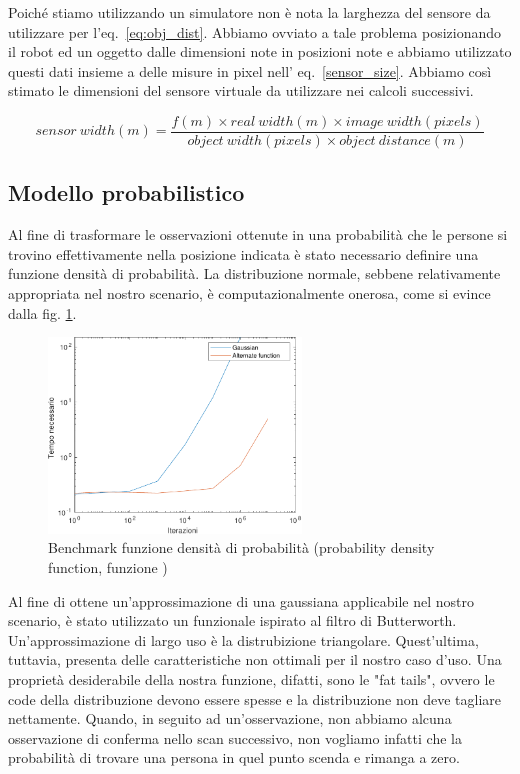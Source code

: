 \documentclass[a4paper]{article}
\begin{document}
	Poiché stiamo utilizzando un simulatore non è nota la larghezza del sensore da utilizzare per l'eq.~\ref{eq:obj_dist}. Abbiamo ovviato a tale problema posizionando il robot ed un oggetto dalle dimensioni note in posizioni note e abbiamo utilizzato questi dati insieme a delle misure in pixel nell' eq.~\ref{sensor_size}. Abbiamo così stimato le dimensioni del sensore virtuale da utilizzare nei calcoli successivi.

	\begin{equation}\label{sensor_size}
	sensor~width(m) = 
	\frac{f(m) \times real~width(m) \times image~width(pixels)}
	{object~width(pixels) \times object~distance(m)}
	\end{equation}
	
	\subsection{Modello probabilistico}\label{subsec:Modello-probabilistico}
	Al fine di trasformare le osservazioni ottenute in una probabilità che le persone si trovino effettivamente nella posizione indicata è stato necessario definire una funzione densità di probabilità. La distribuzione normale, sebbene relativamente appropriata nel nostro scenario, è computazionalmente onerosa, come si evince dalla fig. \ref{fig:pdf_benchmark}.
	
	\begin{figure}[H]
		\centering
		\includegraphics[width=0.6\textwidth]{./img/pdf_benchmark.pdf}
		\caption{Benchmark funzione densità di probabilità (probability density function, funzione )}
		\label{fig:pdf_benchmark}
	\end{figure}

	Al fine di ottene un'approssimazione di una gaussiana applicabile nel nostro scenario, è stato utilizzato un funzionale ispirato al filtro di Butterworth. Un'approssimazione di largo uso è la distrubizione triangolare. Quest'ultima, tuttavia, presenta delle caratteristiche non ottimali per il nostro caso d'uso. Una proprietà desiderabile della nostra funzione, difatti, sono le "fat tails", ovvero le code della distribuzione devono essere spesse e la distribuzione non deve tagliare nettamente. Quando, in seguito ad un'osservazione, non abbiamo alcuna osservazione di conferma nello scan successivo, non vogliamo infatti che la probabilità di trovare una persona in quel punto scenda e rimanga a zero.
\end{document}
